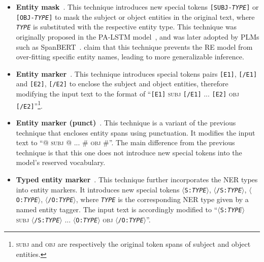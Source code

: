 \documentclass[11pt,a4paper]{article}
\begin{document}
\begin{itemize}[leftmargin=1em]
    \setlength\itemsep{0em}

    \item \textbf{Entity mask}~\cite{zhang-etal-2017-position}. This technique introduces new special tokens \texttt{[SUBJ-\emph{TYPE}]} or \texttt{[OBJ-\emph{TYPE}]} to mask the subject or object entities in the original text, where \texttt{\emph{TYPE}} is substituted with the respective entity type.
    This technique was originally proposed in the PA-LSTM model~\cite{zhang-etal-2017-position}, and was later adopted by PLMs such as SpanBERT~\cite{joshi-etal-2020-spanbert}.
    \citet{zhang-etal-2017-position} claim that this technique prevents the RE model from over-fitting specific entity names, leading to more generalizable inference.

    \item \textbf{Entity marker}~\cite{zhang-etal-2019-ernie,baldini-soares-etal-2019-matching}. This technique introduces special tokens pairs \texttt{[E1]}, \texttt{[/E1]} and \texttt{[E2]}, \texttt{[/E2]} to enclose the subject and object entities, therefore modifying the input text to the format of ``\texttt{[E1]} \textsc{subj} \texttt{[/E1]} ... \texttt{[E2]} \textsc{obj} \texttt{[/E2]}''\footnote{\textsc{subj} and \textsc{obj} are respectively the original token spans of subject and object entities.}.

    \item \textbf{Entity marker (punct)}~\cite{wang2020k,zhou2021atlop}. This technique is a variant of the previous technique that encloses entity spans using punctuation.
    It modifies the input text to ``@ \textsc{subj} @ ... \# \textsc{obj} \#''. The main difference from the previous technique is that this one does not introduce new special tokens into the model's reserved vocabulary.

    \item \textbf{Typed entity marker}~\cite{zhong2020frustratingly}. This technique further incorporates the NER types into entity markers.
    It introduces new special tokens \texttt{$\langle$S:\emph{TYPE}$\rangle$}, \texttt{$\langle$/S:\emph{TYPE}$\rangle$}, \texttt{$\langle$O:\emph{TYPE}$\rangle$}, \texttt{$\langle$/O:\emph{TYPE}$\rangle$}, where \texttt{\emph{TYPE}} is the corresponding NER type given by a named entity tagger. The input text is accordingly modified to ``\texttt{$\langle$S:\emph{TYPE}$\rangle$} \textsc{subj} \texttt{$\langle$/S:\emph{TYPE}$\rangle$} ... \texttt{$\langle$O:\emph{TYPE}$\rangle$} \textsc{obj} \texttt{$\langle$/O:\emph{TYPE}$\rangle$}''.


\end{itemize}
\end{document}
